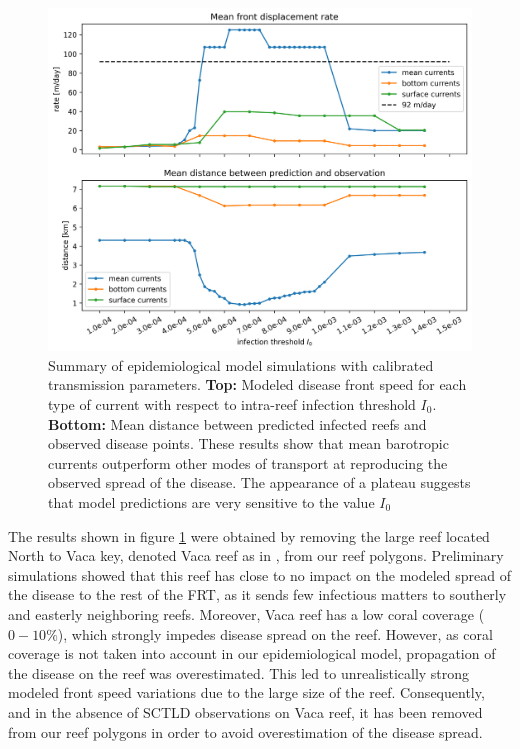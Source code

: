 \documentclass[utf8]{frontiersSCNS}
\begin{document}
\begin{figure}
    \centering
    \includegraphics[width=.8\textwidth]{figures/sctld_validation_corrected.png}
    \caption{Summary of epidemiological model simulations with calibrated transmission parameters. \textbf{Top:} Modeled disease front speed for each type of current with respect to intra-reef infection threshold $I_0$. \textbf{Bottom:} Mean distance between predicted infected reefs and observed disease points. These results show that mean barotropic currents outperform other modes of transport at reproducing the observed spread of the disease. The appearance of a plateau suggests that model predictions are very sensitive to the value $I_0$}
    \label{fig:results}
\end{figure}

The results shown in figure \ref{fig:results} were obtained by removing the large reef located North to Vaca key, denoted Vaca reef as in \cite{frys20}, from our reef polygons. Preliminary simulations showed that this reef has close to no impact on the modeled spread of the disease to the rest of the FRT, as it sends few infectious matters to southerly and easterly neighboring reefs. Moreover, Vaca reef has a low coral coverage ($0-10\%$), which strongly impedes disease spread on the reef. However, as coral coverage is not taken into account in our epidemiological model, propagation of the disease on the reef was overestimated. This led to unrealistically strong modeled front speed variations due to the large size of the reef. Consequently, and in the absence of SCTLD observations on Vaca reef, it has been removed from our reef polygons in order to avoid overestimation of the disease spread.

\end{document}
